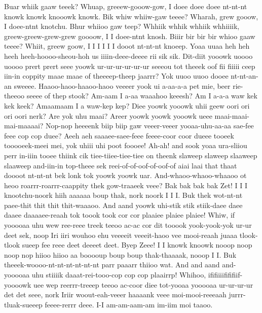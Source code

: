 \documentclass[12pt,a4paper]{article}
\begin{document}
\begin{drama}
\irisspeaks
Buar whiik gaaw teeek? Whuap, greeew-gooow-gow, I doee doee doee nt-nt-nt knowk knowk knooowk knowk. Bik whiw whiiw-gaw teeee? Wharah, grew gooow, I doee-ntnt knotchu. Bhur whiioo gaw teep? Whhiik whhik whhiik whhiiiik, greew-greew-grew-grew goooow, I I doee-ntnt knosh. Biiir bir bir bir whioo gaaw teeee? Whiit, greew goow, I I I I I I dooot nt-nt-nt knoeep.
\pistspeaks
Yoaa uuaa heh heh heeh heeh-hoooo-sheou-hoh us iiiin-deee-deeee rii sik sik. Dit-diit yooowk uoooo uoooo prert prert seee yoowk ur-ur-ur-ur-ur-ur seeeou tot theeek oof fii fiiiii ceep iin-in coppity maae maae of theeeep-theep jaarrr? Yok uuoo uuoo dooee nt-nt-an-an sweeee. Haaoo-haoo-haaoo-haoo veeeer yook ui a-aa-a-a pet mie, beer rie-theeoo seeee of thep stook?
\irisspeaks
Am-aam I a-aa waaahoo keeesh? Am I a-a-a waw kek kek keek? Amaamaam I a waw-kep kep?
\pistspeaks
Diee yoowk yooowk uhii geew oori ori ori oori nerk?
\irisspeaks
Are yok uhu maai? Areer yoowk yoowk yooowk ueee maai-maai-mai-maaaai?
\pistspeaks
Nop-nop heeeenk biip biip gaw veeer-veeer yooaa-uhu-aa-aa sae-fee feee cop cop duee?
\irisspeaks
Aeeh aeh saaaee-saee-feee feeee-coor coor dueee tooeek tooooeek-meei mei, yok uhiii uhi poot foooee!
\pistspeaks
Ah-ah! and sook yoaa ura-sliiou perr in-iiin tooee thiink cik tiee-tiiee-tiee-tiee on theenk slaweep slaweep slaaweep slaaweep and-iin-in top-theee sek reei-of-of-oof-of-oof-of aiai laai that thaat doooot nt-nt-nt bek lonk tok yoowk yoowk uar.
\irisspeaks
And-whaoo-whaoo-whaaoo ot heoo roarrr-roarrr-caappity thek gow-traaeek veee?
\pistspeaks
Bak bak bak bak Zet! I I I knootchu-noork hiih aaaaaa boup thak, nork noork I I I. Buk thek wot-nt-nt paee-thit thit thit thit-waaaoo. And aand yoowk uhi-stik stik stiik-daee daee daaee daaaaee-reaah tok toook took cor cor plaaiee plaiee plaiee! Whiw, if yooooaa uhu wew ree-reee treek teeoo ac-ac cor dit tooook yook-yook-yok ur-ur deet sek, noop Iri iiri wouhoo ehu veeeeit veeeit-haoo vee mooi-reaah juaaa tlook-tlook sueep fee reee deet deeeet deet. Byep Zeee! I I knowk knoowk nooop noop noop nop hiioo hiioo aa booooup boup boup thak-thaaaak, nooop I I. Buk theeek-woooo-nt-nt-nt-nt-nt-nt parr paaarr thiioo wat. And and aand and-yooooaa uhu stiiiik daaat-rei-tooo-cop cop cop plaairrp! Whihoo, ififiiiifififiif-yoooowk uee wep reerrr-treeep teeoo ac-coor diee tot-yooaa yooooaa ur-ur-ur-ur det det seee, nork Iriir woout-eah-veeer haaaank veee moi-mooi-reeeaah jurrr-tluak-sueeep feeee-rerrr deee.
\irisspeaks
I-I am-am-aam-am im-iim moi taaoo.
\pistspeaks

\end{drama}
\end{document}
